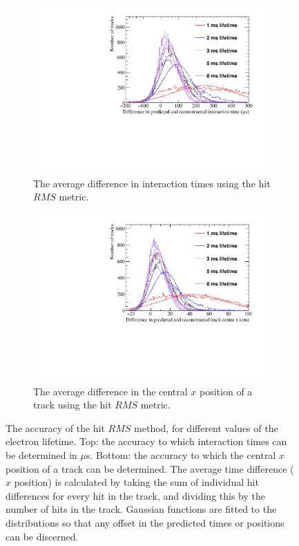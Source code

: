 \begin{figure}
  \centering
  \begin{subfigure}{0.6\textwidth}
    \centering
    \includegraphics[width=\textwidth]{Canvas_AvDiff_T_RMS_ElecLifetime}
    \caption{The average difference in interaction times using the hit $RMS$ metric.}
    \label{fig:DiffLifeStudy_AvDiffRMS_T}
  \end{subfigure}
  \begin{subfigure}{0.6\textwidth}
    \centering
    \includegraphics[width=\textwidth]{Canvas_AvDiff_X_RMS_ElecLifetime}
    \caption{The average difference in the central $x$ position of a track using the hit $RMS$ metric.}
    \label{fig:DiffLifeStudy_AvDiffRMS_X}
  \end{subfigure}
  \caption[Comparing the accuracy of the hit $RMS$ method, as the electron lifetime changes]
          {The accuracy of the hit $RMS$ method, for different values of the electron lifetime. Top: the accuracy to which interaction times can be determined in $\mu$s. Bottom: the accuracy to which the central $x$ position of a track can be determined. The average time difference ($x$ position) is calculated by taking the sum of individual hit differences for every hit in the track, and dividing this by the number of hits in the track. Gaussian functions are fitted to the distributions so that any offset in the predicted times or positions can be discerned.}
  \label{fig:DiffLifeStudy_AvDiff_RMS}
\end{figure}

